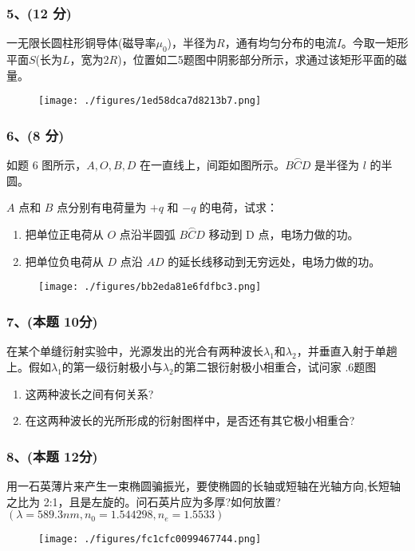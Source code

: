 \subsubsection{5、(12 分)}
一无限长圆柱形铜导体(磁导率$\mu_0$)，半径为$R$，通有均匀分布的电流$I$。今取一矩形平面$S$(长为$L$，宽为$2R$)，位置如二5题图中阴影部分所示，求通过该矩形平面的磁量。
\begin{figure}[ht]
\centering
\texttt{[image: ./figures/1ed58dca7d8213b7.png]}
\caption{} \label{fig_CD13_5}
\end{figure}
\subsubsection{6、(8 分)}
如题 6 图所示，$A,O,B,D$ 在一直线上，间距如图所示。$ \overset{\frown}{BCD} $ 是半径为 $l$ 的半圆。

$A$ 点和 $B$ 点分别有电荷量为 $+q$ 和 $-q$ 的电荷，试求：
\begin{enumerate}
\item 把单位正电荷从 $O$ 点沿半圆弧 $\overset{\frown}{BCD}$ 移动到 D 点，电场力做的功。
\item 把单位负电荷从 $D$ 点沿 $AD$ 的延长线移动到无穷远处，电场力做的功。
\end{enumerate}
\begin{figure}[ht]
\centering
\texttt{[image: ./figures/bb2eda81e6fdfbc3.png]}
\caption{} \label{fig_CD13_6}
\end{figure}
\subsubsection{7、(本题 10分)}
在某个单缝衍射实验中，光源发出的光合有两种波长$\lambda_1$和$\lambda_2$，并垂直入射于单趟上。假如$\lambda_1$的第一级衍射极小与$\lambda_2$的第二银衍射极小相重合，试问家
.6题图
\begin{enumerate}
\item 这两种波长之间有何关系?
\item 在这两种波长的光所形成的衍射图样中，是否还有其它极小相重合?
\end{enumerate}
\subsubsection{8、(本题 12分)}
用一石英薄片来产生一束椭圆骗振光，要使椭圆的长轴或短轴在光轴方向,长短轴之比为 2:1，且是左旋的。问石英片应为多厚?如何放置?$(\lambda=589.3nm,n_0=1.544298,n_e=1.5533)$
\begin{figure}[ht]
\centering
\texttt{[image: ./figures/fc1cfc0099467744.png]}
\caption{} \label{fig_CD13_7}
\end{figure}

